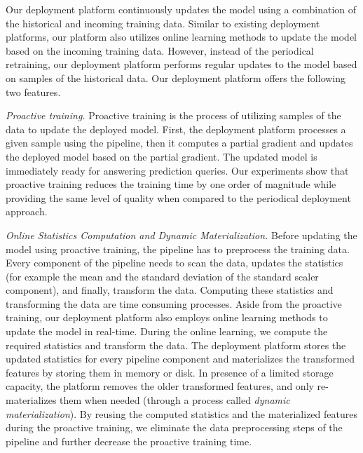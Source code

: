 
Our deployment platform continuously updates the model using a combination of the historical and incoming training data.
Similar to existing deployment platforms, our platform also utilizes online learning methods to update the model based on the incoming training data.
However, instead of the periodical retraining, our deployment platform performs regular updates to the model based on samples of the historical data.
Our deployment platform offers the following two features.

\textit{Proactive training.}
Proactive training is the process of utilizing samples of the data to update the deployed model.
First, the deployment platform processes a given sample using the pipeline, then it computes a partial gradient and updates the deployed model based on the partial gradient.
The updated model is immediately ready for answering prediction queries.
Our experiments show that proactive training reduces the training time by one order of magnitude while providing the same level of quality when compared to the periodical deployment approach.

\textit{Online Statistics Computation and Dynamic Materialization.}
Before updating the model using proactive training, the pipeline has to preprocess the training data.
Every component of the pipeline needs to scan the data, updates the statistics (for example the mean and the standard deviation of the standard scaler component), and finally, transform the data.
Computing these statistics and transforming the data are time consuming processes.
Aside from the proactive training, our deployment platform also employs online learning methods to update the model in real-time.
During the online learning, we compute the required statistics and transform the data.
The deployment platform stores the updated statistics for every pipeline component and materializes the transformed features by storing them in memory or disk.
In presence of a limited storage capacity, the platform removes the older transformed features, and only re-materializes them when needed (through a process called \textit{dynamic materialization}).
By reusing the computed statistics and the materialized features during the proactive training, we eliminate the data preprocessing steps of the pipeline and further decrease the proactive training time.

